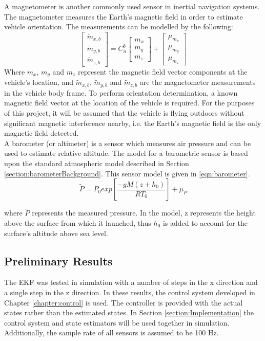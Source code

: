 A magnetometer is another commonly used sensor in inertial navigation systems. The magnetometer measures the Earth's magnetic field in order to estimate vehicle orientation. The measurements can be modelled by the following:
\begin{equation}\label{eqn:mag}
\begin{bmatrix}
\tilde{m}_{x,b}\\
\tilde{m}_{y,b}\\
\tilde{m}_{z,b}
\end{bmatrix}
=
C^{b}_{n}
\begin{bmatrix}
m_{x}\\
m_{y}\\
m_{z}
\end{bmatrix}
+
\begin{bmatrix}
\mu_{m_{x}}\\
\mu_{m_{y}}\\
\mu_{m_{z}}
\end{bmatrix}
\end{equation}
Where $m_{x}$, $m_{y}$ and $m_{z}$ represent the magnetic field vector components at the vehicle's location, and $\tilde{m}_{x,b}$, $\tilde{m}_{y,b}$ and $\tilde{m}_{z,b}$ are the magnetometer measurements in the vehicle body frame. To perform orientation determination, a known magnetic field vector at the location of the vehicle is required. For the purposes of this project, it will be assumed that the vehicle is flying outdoors without significant magnetic interference nearby, i.e. the Earth's magnetic field is the only magnetic field detected.\\

A barometer (or altimeter) is a sensor which measures air pressure and can be used to estimate relative altitude. The model for a barometric sensor is based upon the standard atmospheric model described in Section \ref{section:barometerBackground}. This sensor model is given in \eqref{eqn:barometer}.
\begin{equation}\label{eqn:barometer}
\tilde{P}=P_{0}exp\left[\frac{-g M (z+h_{0})}{R T_{0}}\right]+\mu_{P}
\end{equation}

where $\tilde{P}$ represents the measured pressure. In the model, z represents the height above the surface from which it launched, thus $h_{0}$ is added to account for the surface's altitude above sea level.


\subsection{Preliminary Results}
The EKF was tested in simulation with a number of steps in the x direction and a single step in the z direction. In these results, the control system developed in Chapter \ref{chapter:control} is used. The controller is provided with the actual states rather than the estimated states. In Section \ref{section:Implementation} the control system and state estimators will be used together in simulation. Additionally, the sample rate of all sensors is assumed to be 100 Hz.\\

